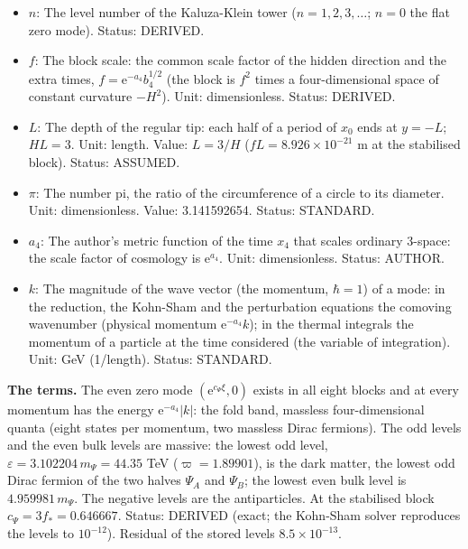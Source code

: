 \documentclass[
  10pt,
]{article}
\begin{document}
\begin{itemize}
  \(\varpi,\ \varpi_n\): The wave number of an oscillating \(x_0\)
  profile on \(-1 \le \xi \le 0\) (of a boson after the rescaling, or of
  a bulk level of dirac16complex); \(\varpi_n\) that of the \(n\)-th
  even level (\(\varpi_n = n\pi\) for \(\beta = 0\)). Unit:
  dimensionless. Value: 1.89901 for the lowest odd level of
  dirac16complex. Status: DERIVED.
\item
  \(n\): The level number of the Kaluza-Klein tower
  (\(n = 1, 2, 3, \dots\); \(n = 0\) the flat zero mode). Status:
  DERIVED.
\item
  \(f\): The block scale: the common scale factor of the hidden
  direction and the extra times, \(f = \mathrm{e}^{-a_4}b_4^{1/2}\) (the
  block is \(f^2\) times a four-dimensional space of constant curvature
  \(-H^2\)). Unit: dimensionless. Status: DERIVED.
\item
  \(L\): The depth of the regular tip: each half of a period of \(x_0\)
  ends at \(y = -L\); \(HL = 3\). Unit: length. Value: \(L = 3/H\)
  (\(fL = 8.926\times10^{-21}\) m at the stabilised block). Status:
  ASSUMED.
\item
  \(\pi\): The number pi, the ratio of the circumference of a circle to
  its diameter. Unit: dimensionless. Value: 3.141592654. Status:
  STANDARD.
\item
  \(a_4\): The author's metric function of the time \(x_4\) that scales
  ordinary 3-space: the scale factor of cosmology is
  \(\mathrm{e}^{a_4}\). Unit: dimensionless. Status: AUTHOR.
\item
  \(k\): The magnitude of the wave vector (the momentum, \(\hbar = 1\))
  of a mode: in the reduction, the Kohn-Sham and the perturbation
  equations the comoving wavenumber (physical momentum
  \(\mathrm{e}^{-a_4}k\)); in the thermal integrals the momentum of a
  particle at the time considered (the variable of integration). Unit:
  GeV (1/length). Status: STANDARD.
\end{itemize}

\textbf{The terms.} The even zero mode \((\mathrm{e}^{c_\Psi\xi}, 0)\)
exists in all eight blocks and at every momentum has the energy
\(\mathrm{e}^{-a_4}\lvert k\rvert\): the fold band, massless
four-dimensional quanta (eight states per momentum, two massless Dirac
fermions). The odd levels and the even bulk levels are massive: the
lowest odd level, \(\varepsilon = 3.102204\,m_\Psi = 44.35\) TeV
(\(\varpi = 1.89901\)), is the dark matter, the lowest odd Dirac fermion
of the two halves \(\Psi_A\) and \(\Psi_B\); the lowest even bulk level
is \(4.959981\,m_\Psi\). The negative levels are the antiparticles. At
the stabilised block \(c_\Psi = 3f_* = 0.646667\). Status: DERIVED
(exact; the Kohn-Sham solver reproduces the levels to \(10^{-12}\)).
Residual of the stored levels \(8.5\times10^{-13}\).
\end{document}
